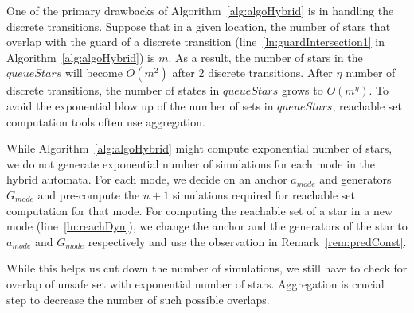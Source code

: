 One of the primary drawbacks of Algorithm~\ref{alg:algoHybrid} is in handling the discrete transitions. 
%
Suppose that in a given location, the number of stars that overlap with the guard of a discrete transition (line~\ref{ln:guardIntersection1} in Algorithm~\ref{alg:algoHybrid}) is $m$.
%
As a result, the number of stars in the $queueStars$ will become $O(m^2)$ after 2 discrete transitions. After $\eta$ number of discrete transitions, the number of states in $queueStars$ grows to $O(m^{\eta})$.
%
To avoid the exponential blow up of the number of sets in $queueStars$, reachable set computation tools often use aggregation.

\begin{remark}
\label{rem:hybridAlgo}
While Algorithm~\ref{alg:algoHybrid} might compute exponential number of stars, we do not generate exponential number of simulations for each mode in the hybrid automata. For each mode, we decide on an anchor $a_{mode}$ and generators $G_{mode}$ and pre-compute the $n+1$ simulations required for reachable set computation for that mode. For computing the reachable set of a star in a new mode (line~\ref{ln:reachDyn}), we change the anchor and the generators of the star to $a_{mode}$ and $G_{mode}$ respectively and use the observation in Remark~\ref{rem:predConst}. 

While this helps us cut down the number of simulations, we still have to check for overlap of unsafe set with exponential number of stars. Aggregation is crucial step to decrease the number of such possible overlaps.
\end{remark}


%
%
